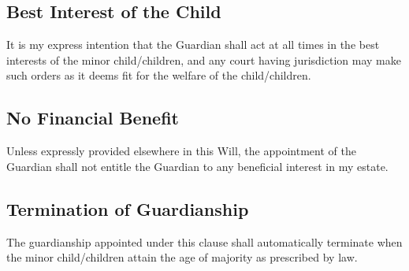 \subsection*{Best Interest of the Child}
It is my express intention that the Guardian shall act at all times in the best interests of the minor child/children, and any court having jurisdiction may make such orders as it deems fit for the welfare of the child/children.

\subsection*{No Financial Benefit}
Unless expressly provided elsewhere in this Will, the appointment of the Guardian shall not entitle the Guardian to any beneficial interest in my estate.

\subsection*{Termination of Guardianship}
The guardianship appointed under this clause shall automatically terminate when the minor child/children attain the age of majority as prescribed by law.

